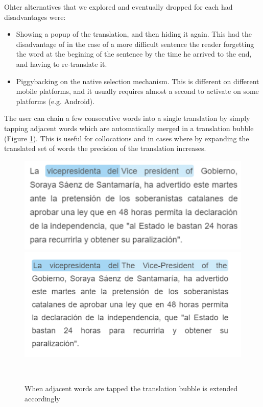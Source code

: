 Ohter alternatives that we explored and eventually dropped for each had disadvantages were: 
\begin{itemize}

  \item Showing a popup of the translation, and then hiding it again. This had the disadvantage of in the case of a more difficult sentence the reader forgetting the word at the begining of the sentence by the time he arrived to the end, and having to re-translate it. 

  \item Piggybacking on the native selection mechanism. This is different on different mobile platforms, and it usually requires almost a second to activate on some platforms (e.g. Android).
\end{itemize}


The user can chain a few consecutive words into a single translation by simply tapping adjacent words which are automatically merged in a translation bubble (Figure \ref{fig:translation_extension}). This is useful for collocations and in cases where by expanding the translated set of words the precision of the translation increases. 

    \begin{figure}[h!]
    \centering
      \includegraphics[width=0.8\columnwidth]{figures/translated_words1}
      \includegraphics[width=0.8\columnwidth]{figures/translated_words2}
      \caption{When adjacent words are tapped the translation bubble is extended accordingly}~\label{fig:translation_extension}
    \end{figure}

